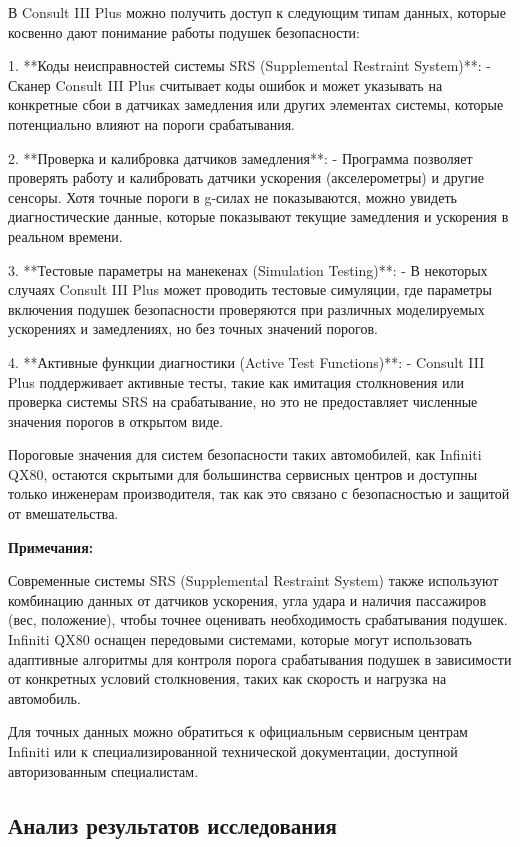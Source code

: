 В Consult III Plus можно получить доступ к следующим типам данных, которые косвенно дают понимание работы подушек безопасности:

1. **Коды неисправностей системы SRS (Supplemental Restraint System)**:
- Сканер Consult III Plus считывает коды ошибок и может указывать на конкретные сбои в датчиках замедления или других элементах системы, которые потенциально влияют на пороги срабатывания.

2. **Проверка и калибровка датчиков замедления**:
- Программа позволяет проверять работу и калибровать датчики ускорения (акселерометры) и другие сенсоры. Хотя точные пороги в g-силах не показываются, можно увидеть диагностические данные, которые показывают текущие замедления и ускорения в реальном времени.

3. **Тестовые параметры на манекенах (Simulation Testing)**:
- В некоторых случаях Consult III Plus может проводить тестовые симуляции, где параметры включения подушек безопасности проверяются при различных моделируемых ускорениях и замедлениях, но без точных значений порогов.

4. **Активные функции диагностики (Active Test Functions)**:
- Consult III Plus поддерживает активные тесты, такие как имитация столкновения или проверка системы SRS на срабатывание, но это не предоставляет численные значения порогов в открытом виде.

Пороговые значения для систем безопасности таких автомобилей, как Infiniti QX80, остаются скрытыми для большинства сервисных центров и доступны только инженерам производителя, так как это связано с безопасностью и защитой от вмешательства.




\textbf{Примечания:}

Современные системы SRS (Supplemental Restraint System) также используют комбинацию данных от датчиков ускорения, угла удара и наличия пассажиров (вес, положение), чтобы точнее оценивать необходимость срабатывания подушек.
Infiniti QX80 оснащен передовыми системами, которые могут использовать адаптивные алгоритмы для контроля порога срабатывания подушек в зависимости от конкретных условий столкновения, таких как скорость и нагрузка на автомобиль.

Для точных данных можно обратиться к официальным сервисным центрам Infiniti или к специализированной технической документации, доступной авторизованным специалистам.


\subsection{Анализ результатов исследования}



